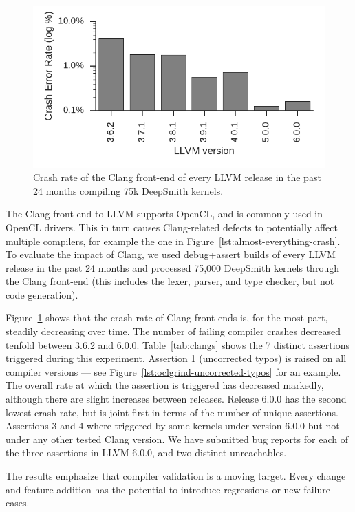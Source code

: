 \begin{figure}
  \centering %
  \includegraphics[width=.95\columnwidth]{build/img/clang-crashes}%
  \caption{%
    Crash rate of the Clang front-end of every LLVM release in the past 24 months compiling 75k DeepSmith kernels.
  }%
  \label{fig:clangs} %
\end{figure}

\begin{table}
  \scriptsize %
  \centering %
  
  \caption{%
    The number of DeepSmith programs which trigger distinct Clang front-end assertions, and the number of programs which trigger unreachables.%
  }
  \label{tab:clangs}
\end{table}

The Clang front-end to LLVM supports OpenCL, and is commonly used in OpenCL drivers. This in turn causes Clang-related defects to potentially affect multiple compilers, for example the one in Figure~\ref{lst:almost-everything-crash}. To evaluate the impact of Clang, we used debug+assert builds of every LLVM release in the past 24 months and processed 75,000 DeepSmith kernels through the Clang front-end (this includes the lexer, parser, and type checker, but not code generation).

Figure~\ref{fig:clangs} shows that the crash rate of Clang front-ends is, for the most part, steadily decreasing over time. The number of failing compiler crashes decreased tenfold between 3.6.2 and 6.0.0.
Table~\ref{tab:clangs} shows the 7 distinct assertions triggered during this experiment. Assertion 1 (uncorrected typos) is raised on all compiler versions --- see Figure~\ref{lst:oclgrind-uncorrected-typos} for an example. The overall rate at which the assertion is triggered has decreased markedly, although there are slight increases between releases. Release 6.0.0 has the second lowest crash rate, but is joint first in terms of the number of unique assertions. Assertions 3 and 4 where triggered by some kernels under version 6.0.0 but not under any other tested Clang version. We have submitted bug reports for each of the three assertions in LLVM 6.0.0, and two distinct unreachables.

The results emphasize that compiler validation is a moving target. Every change and feature addition has the potential to introduce regressions or new failure cases.
